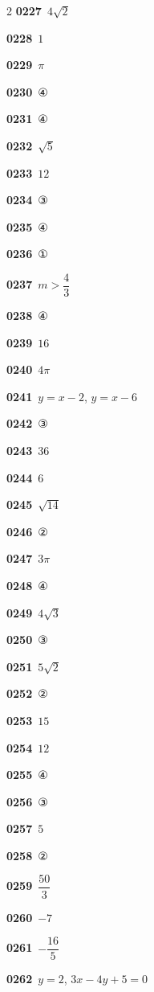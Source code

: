 \documentclass[10pt,a4paper]{article}
\begin{document}
\begin{multicols}{2}
\noindent\textbf{0227}\ $4\sqrt{2}$\par
\noindent\textbf{0228}\ $1$\par
\noindent\textbf{0229}\ $\pi$\par
\noindent\textbf{0230}\ ④\par
\noindent\textbf{0231}\ ④\par
\noindent\textbf{0232}\ $\sqrt{5}$\par
\noindent\textbf{0233}\ $12$\par
\noindent\textbf{0234}\ ③\par
\noindent\textbf{0235}\ ④\par
\noindent\textbf{0236}\ ①\par
\noindent\textbf{0237}\ $m>\dfrac{4}{3}$\par
\noindent\textbf{0238}\ ④\par
\noindent\textbf{0239}\ $16$\par
\noindent\textbf{0240}\ $4\pi$\par
\noindent\textbf{0241}\ $y=x-2$, $y=x-6$\par
\noindent\textbf{0242}\ ③\par
\noindent\textbf{0243}\ $36$\par
\noindent\textbf{0244}\ $6$\par
\noindent\textbf{0245}\ $\sqrt{14}$\par
\noindent\textbf{0246}\ ②\par
\noindent\textbf{0247}\ $3\pi$\par
\noindent\textbf{0248}\ ④\par
\noindent\textbf{0249}\ $4\sqrt{3}$\par
\noindent\textbf{0250}\ ③\par
\noindent\textbf{0251}\ $5\sqrt{2}$\par
\noindent\textbf{0252}\ ②\par
\noindent\textbf{0253}\ $15$\par
\noindent\textbf{0254}\ $12$\par
\noindent\textbf{0255}\ ④\par
\noindent\textbf{0256}\ ③\par
\noindent\textbf{0257}\ $5$\par
\noindent\textbf{0258}\ ②\par
\noindent\textbf{0259}\ $\dfrac{50}{3}$\par
\noindent\textbf{0260}\ $-7$\par
\noindent\textbf{0261}\ $-\dfrac{16}{5}$\par
\noindent\textbf{0262}\ $y=2$, $3x-4y+5=0$\par

\end{multicols}
\end{document}
